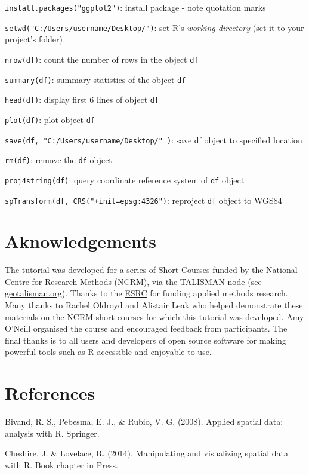 \documentclass[]{article}
\begin{document}
\texttt{install.packages("ggplot2")}: install package - note quotation
marks

\texttt{setwd("C:/Users/username/Desktop/")}: set R's \emph{working
directory} (set it to your project's folder)

\texttt{nrow(df)}: count the number of rows in the object \texttt{df}

\texttt{summary(df)}: summary statistics of the object \texttt{df}

\texttt{head(df)}: display first 6 lines of object \texttt{df}

\texttt{plot(df)}: plot object \texttt{df}

\texttt{save(df, "C:/Users/username/Desktop/" )}: save df object to
specified location

\texttt{rm(df)}: remove the \texttt{df} object

\texttt{proj4string(df)}: query coordinate reference system of
\texttt{df} object

\texttt{spTransform(df, CRS("+init=epsg:4326")}: reproject \texttt{df}
object to WGS84

\section{Aknowledgements}\label{aknowledgements}

The tutorial was developed for a series of Short Courses funded by the
National Centre for Research Methods (NCRM), via the TALISMAN node (see
\href{http://www.geotalisman.org/}{geotalisman.org}). Thanks to the
\href{http://www.esrc.ac.uk/}{ESRC} for funding applied methods
research. Many thanks to Rachel Oldroyd and Alistair Leak who helped
demonstrate these materials on the NCRM short courses for which this
tutorial was developed. Amy O'Neill organised the course and encouraged
feedback from participants. The final thanks is to all users and
developers of open source software for making powerful tools such as R
accessible and enjoyable to use.

\section{References}\label{references}

Bivand, R. S., Pebesma, E. J., \& Rubio, V. G. (2008). Applied spatial
data: analysis with R. Springer.

Cheshire, J. \& Lovelace, R. (2014). Manipulating and visualizing
spatial data with R. Book chapter in Press.
\end{document}
